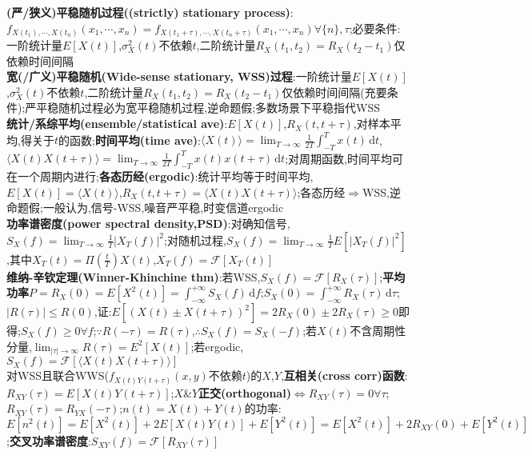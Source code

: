 \documentclass[UTF8,a4paper,10pt]{article}
\providecommand{\abs}[1]{\left\lvert#1\right\rvert}
\begin{document}
\begin{multicols}{2}
    \textbf{(严/狭义)平稳随机过程((strictly) stationary process)}:$f_{X(t_1),\cdots,X(t_n)}(x_1,\cdots,x_n)=f_{X(t_1+\tau),\cdots,X(t_n+\tau)}(x_1,\cdots,x_n)\forall\{n\},\tau$;必要条件:一阶统计量$E[X(t)]$,$\sigma_X^2(t)$不依赖$t$,二阶统计量$R_X(t_1,t_2)=R_X(t_2-t_1)$仅依赖时间间隔\\
    \textbf{宽(/广义)平稳随机(Wide-sense stationary, WSS)过程}:一阶统计量$E[X(t)]$,$\sigma_X^2(t)$不依赖$t$,二阶统计量$R_X(t_1,t_2)=R_X(t_2-t_1)$仅依赖时间间隔(充要条件);严平稳随机过程必为宽平稳随机过程,逆命题假;多数场景下平稳指代WSS\\
    \textbf{统计/系综平均(ensemble/statistical ave)}:$E[X(t)]$,$R_X(t,t+\tau)$,对样本平均,得关于$t$的函数;\textbf{时间平均(time ave)}:$\langle X(t)\rangle=\lim_{T\rightarrow\infty}\frac{1}{2T}\int_{-T}^Tx(t)\,\mathrm{d}t$,$\langle X(t)X(t+\tau)\rangle=\lim_{T\rightarrow\infty}\frac{1}{2T}\int_{-T}^Tx(t)x(t+\tau)\,\mathrm{d}t$;对周期函数,时间平均可在一个周期内进行;\textbf{各态历经(ergodic)}:统计平均等于时间平均,$E[X(t)]=\langle X(t)\rangle$,$R_X(t,t+\tau)=\langle X(t)X(t+\tau)\rangle$;各态历经$\Rightarrow$WSS,逆命题假;一般认为,信号-WSS,噪音严平稳,时变信道ergodic\\
    \textbf{功率谱密度(power spectral density,PSD)}:对确知信号,$S_X(f)=\lim_{T\rightarrow\infty}\frac{1}{T}\abs{X_T(f)}^2$;对随机过程,$S_X(f)=\lim_{T\rightarrow\infty}\frac{1}{T}E[\abs{X_T(f)}^2]$,其中$X_T(t)=\Pi(\frac{t}{T})X(t)$,$X_T(f)=\mathscr{F}[X_T(t)]$\\
    \textbf{维纳-辛钦定理(Winner-Khinchine thm)}:若WSS,$S_X(f)=\mathscr{F}[R_X(\tau)]$;\textbf{平均功率}$P=R_X(0)=E[X^2(t)]=\int_{-\infty}^{+\infty}S_X(f)\,\mathrm{d}f$;$S_X(0)=\int_{-\infty}^{+\infty}R_X(\tau)\,\mathrm{d}\tau$;$\abs{R(\tau)}\leq R(0)$,证:$E[(X(t)\pm X(t+\tau))^2]=2R_X(0)\pm 2R_X(\tau)\geq 0$即得;$S_X(f)\geq 0\forall f$;$\because R(-\tau)=R(\tau)$,$\therefore S_X(f)=S_X(-f)$;若$X(t)$不含周期性分量,$\lim_{\abs{\tau}\rightarrow\infty}R(\tau)=E^2[X(t)]$;若ergodic,$S_X(f)=\mathscr{F}[\langle X(t)X(t+\tau)\rangle]$\\
    对WSS且联合WWS($f_{X(t)Y(t+\tau)}(x,y)$不依赖$t$)的$X$,$Y$,\textbf{互相关(cross corr)函数}:$R_{XY}(\tau)=E[X(t)Y(t+\tau)]$;$X$\&$Y$\textbf{正交(orthogonal)}$\Leftrightarrow R_{XY}(\tau)=0\forall\tau$;$R_{XY}(\tau)=R_{YX}(-\tau)$;$n(t)=X(t)+Y(t)$的功率:$E[n^2(t)]=E[X^2(t)]+2E[X(t)Y(t)]+E[Y^2(t)]=E[X^2(t)]+2R_{XY}(0)+E[Y^2(t)]$;\textbf{交叉功率谱密度}:$S_{XY}(f)=\mathscr{F}[R_{XY}(\tau)]$\\

\end{multicols}
\end{document}
